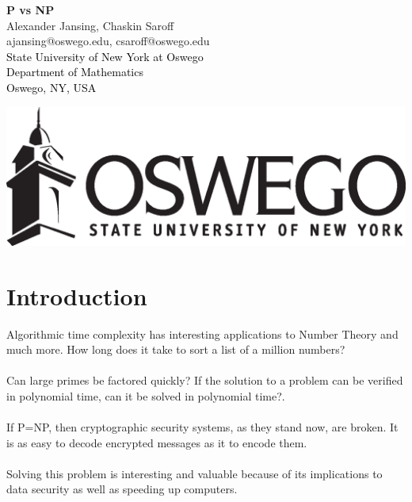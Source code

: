 \documentclass[14pt]{article}
\newcommand{\Black}{\textcolor{Black}}
\theoremstyle{definition}
\theoremstyle{definition}
\begin{document}
\LARGE
\begin{center}
\Large \textbf{P vs NP} \normalsize \\
Alexander Jansing, Chaskin Saroff\\
ajansing@oswego.edu, csaroff@oswego.edu\\
\Black{ \hspace{0 in} State University of New York at Oswego\\ \hspace{0 in} Department of Mathematics\hspace{3.1 in}
\\Oswego, NY, USA\\}
\end{center}
\vspace*{.5 cm}
\includegraphics[scale=.75]{oswego_logo_horiz_blk}
\vspace*{.5 cm}




\section*{Introduction}
Algorithmic time complexity has interesting applications to Number Theory and much more.  How long does it take to sort a list of a million numbers?  
\\
\\
Can large primes be factored quickly?  If the solution to a problem can be verified in polynomial time, can it be solved in polynomial time?.
\\
\\
If P=NP, then cryptographic security systems, as they stand now, are broken.  It is as easy to decode encrypted messages as it to encode them.
\\
\\
Solving this problem is interesting and valuable because of its implications to data security as well as speeding up computers.
\\
\\
\end{document}

